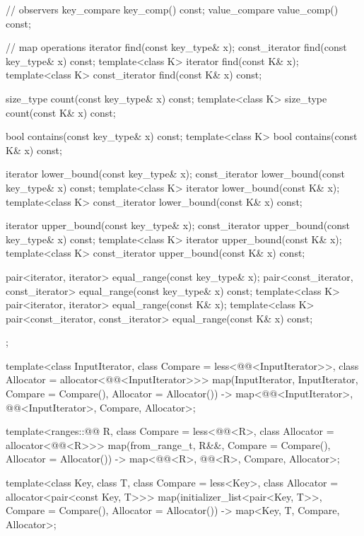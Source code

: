 \begin{codeblock}
{{    // observers
    key_compare key_comp() const;
    value_compare value_comp() const;

    // map operations
    iterator       find(const key_type& x);
    const_iterator find(const key_type& x) const;
    template<class K> iterator       find(const K& x);
    template<class K> const_iterator find(const K& x) const;

    size_type      count(const key_type& x) const;
    template<class K> size_type count(const K& x) const;

    bool           contains(const key_type& x) const;
    template<class K> bool contains(const K& x) const;

    iterator       lower_bound(const key_type& x);
    const_iterator lower_bound(const key_type& x) const;
    template<class K> iterator       lower_bound(const K& x);
    template<class K> const_iterator lower_bound(const K& x) const;

    iterator       upper_bound(const key_type& x);
    const_iterator upper_bound(const key_type& x) const;
    template<class K> iterator       upper_bound(const K& x);
    template<class K> const_iterator upper_bound(const K& x) const;

    pair<iterator, iterator>               equal_range(const key_type& x);
    pair<const_iterator, const_iterator>   equal_range(const key_type& x) const;
    template<class K>
      pair<iterator, iterator>             equal_range(const K& x);
    template<class K>
      pair<const_iterator, const_iterator> equal_range(const K& x) const;
  };

  template<class InputIterator, class Compare = less<@@<InputIterator>>,
           class Allocator = allocator<@@<InputIterator>>>
    map(InputIterator, InputIterator, Compare = Compare(), Allocator = Allocator())
      -> map<@@<InputIterator>, @@<InputIterator>, Compare, Allocator>;

  template<ranges::@@ R, class Compare = less<@@<R>,
           class Allocator = allocator<@@<R>>>
    map(from_range_t, R&&, Compare = Compare(), Allocator = Allocator())
      -> map<@@<R>, @@<R>, Compare, Allocator>;

  template<class Key, class T, class Compare = less<Key>,
           class Allocator = allocator<pair<const Key, T>>>
    map(initializer_list<pair<Key, T>>, Compare = Compare(), Allocator = Allocator())
      -> map<Key, T, Compare, Allocator>;

}
\end{codeblock}
